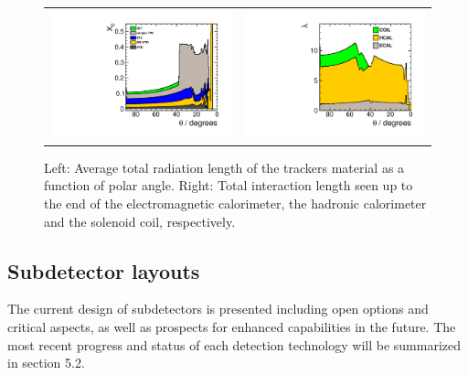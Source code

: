 \begin{figure}[t!]
\begin{tabular}{cc}
\includegraphics[width=0.5\hsize]{Modelling/fig/ILD_l5_v02_matbudget_tracker_85deg.pdf} &
\includegraphics[width=0.5\hsize]{Modelling/fig/ILD_l5_v02_matbudget_calo_85deg.pdf}
\end{tabular}
\caption[Material in the ILD detector]{Left: Average total radiation length of the trackers material as a function of polar angle. Right: Total interaction length seen up to the end of the electromagnetic calorimeter, the hadronic calorimeter and the solenoid coil, respectively.}
\label{fig:det:material}

\end{figure}

\subsection{Subdetector layouts}

The current design of subdetectors is presented including open options and critical aspects, as well as prospects for enhanced capabilities in the future. The most recent progress and status of each detection technology will be summarized in section 5.2.

\vspace{1cm}
